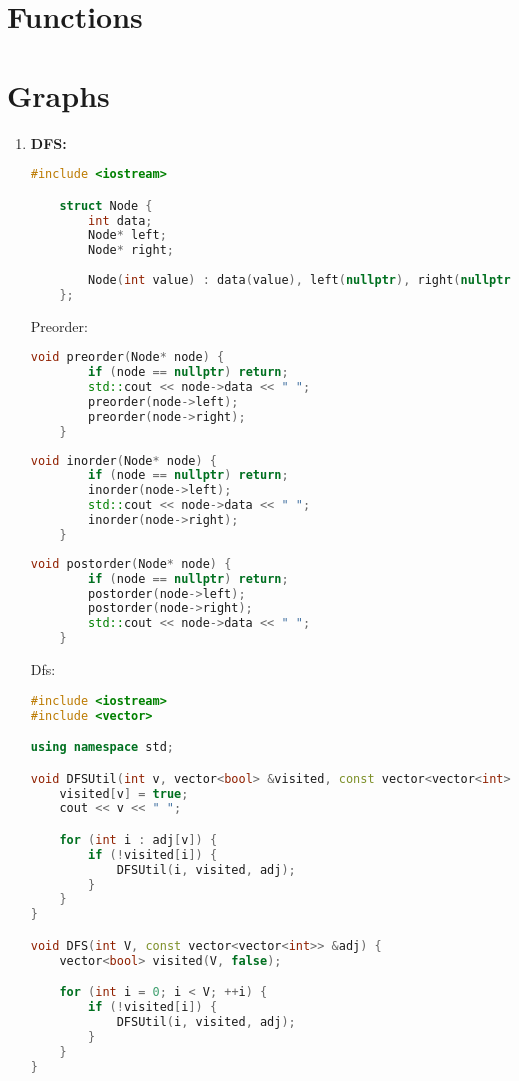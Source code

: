 \section{Functions}
\section*{Graphs}
\begin{enumerate}
  \item \textbf{DFS:}
	\begin{lstlisting}[language=C++]
	#include <iostream>

	struct Node {
	    int data;
	    Node* left;
	    Node* right;
	    
	    Node(int value) : data(value), left(nullptr), right(nullptr) {}
	};
	\end{lstlisting}
	Preorder:
	\begin{lstlisting}[language=C++]
	void preorder(Node* node) {
		if (node == nullptr) return;
		std::cout << node->data << " ";
		preorder(node->left);
		preorder(node->right);
	}
	\end{lstlisting}
	\begin{lstlisting}[language=C++]
	void inorder(Node* node) {
		if (node == nullptr) return;
		inorder(node->left);
		std::cout << node->data << " ";
		inorder(node->right);
	}
	\end{lstlisting}

	\begin{lstlisting}[language=C++]
	void postorder(Node* node) {
		if (node == nullptr) return;
		postorder(node->left);
		postorder(node->right);
		std::cout << node->data << " ";
	}
	\end{lstlisting}
	Dfs:

	\begin{lstlisting}[language=C++]
		#include <iostream>
#include <vector>

using namespace std;

void DFSUtil(int v, vector<bool> &visited, const vector<vector<int>> &adj) {
    visited[v] = true;
    cout << v << " ";

    for (int i : adj[v]) {
        if (!visited[i]) {
            DFSUtil(i, visited, adj);
        }
    }
}

void DFS(int V, const vector<vector<int>> &adj) {
    vector<bool> visited(V, false);

    for (int i = 0; i < V; ++i) {
        if (!visited[i]) {
            DFSUtil(i, visited, adj);
        }
    }
}


\end{lstlisting}
\end{enumerate}
